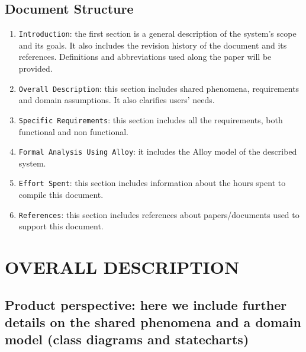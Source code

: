 \documentclass[12pt,a4paper]{article}
\begin{document}
\subsection{Document	Structure} 
\begin{enumerate}
			\item \texttt{Introduction}: the first section is a general description of the system's scope and its goals. It also includes the revision history of the document and its references. Definitions and abbreviations used along the paper will be provided.
			\item \texttt{Overall Description}: this section includes shared phenomena, requirements and domain assumptions. It also clarifies users' needs.
			\item \texttt{Specific Requirements}: this section includes all the requirements, both functional and non functional.
			\item \texttt{Formal Analysis Using Alloy}: it includes the Alloy model of the described system.
			\item \texttt{Effort Spent}: this section includes information about the hours spent to compile this document.
			\item \texttt{References}: this section includes references about papers/documents used to support this document.
		\end{enumerate}
\section{OVERALL	DESCRIPTION}
\subsection{Product	perspective:	here	we	include	 further	details	on	 the	 shared	phenomena	and	a	
domain	model	(class	diagrams	and	statecharts)} 
\end{document}
